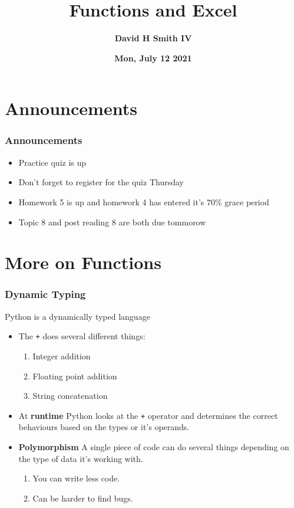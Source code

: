 \documentclass{beamer}
\title{\textbf{Functions and Excel}}
\author{\textbf{David H Smith IV}}
\institute[\textbf{UIUC}]{\textbf{University of Illinois Urbana-Champaign}}
\date{\textbf{Mon, July 12 2021}}
\begin{document}
\frame{\titlepage}

\section{Announcements}

%
%
\begin{frame}
  \frametitle{Announcements}
  \begin{itemize}
    \item Practice quiz is up 
    \item Don't forget to register for the quiz Thursday
    \item Homework 5 is up and homework 4 has entered it's 70\% grace period
    \item Topic 8 and post reading 8 are both due tommorow 
  \end{itemize}
\end{frame}

\section{More on Functions}

%
%
\begin{frame}[fragile]
  \frametitle{Dynamic Typing}
  Python is a dynamically typed language
  \begin{itemize}
    \item The \lstinline|+| does several different things:
      \begin{enumerate}
        \item Integer addition
        \item Floating point addition
        \item String concatenation
      \end{enumerate}
    \item At \textbf{runtime} Python looks at the \lstinline|+| operator and determines the correct behaviours based on the types or it's operands.
    \item \textbf{Polymorphism} \textrightarrow A single piece of code can do several things depending on the type of data it's working with.
      \begin{enumerate}
        \item You can write less code.
        \item Can be harder to find bugs.
      \end{enumerate}

  \end{itemize}
\end{frame}
\end{document}

